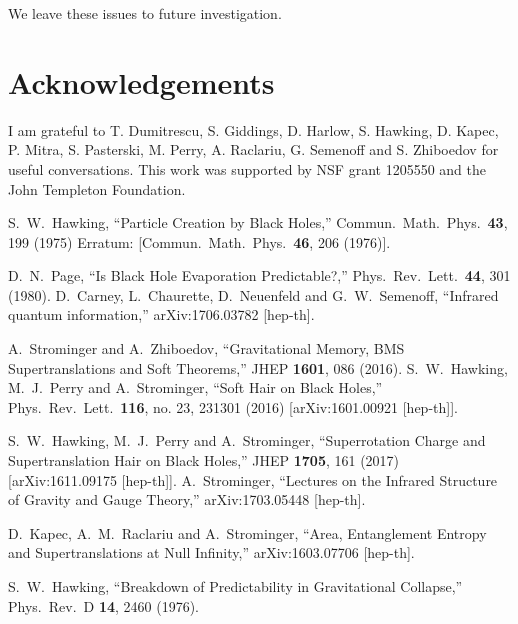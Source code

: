 \documentclass[12pt]{article}
\numberwithin{equation}{section}
\begin{document}
 
We leave these issues to future investigation. 


\section*{Acknowledgements}
I am   grateful  to T. Dumitrescu, S. Giddings, D. Harlow, S. Hawking, D. Kapec, P. Mitra, S. Pasterski, M. Perry, A. Raclariu, G. Semenoff and  S. Zhiboedov for useful conversations. This work was supported by NSF  grant  1205550 and the John Templeton Foundation.






\begin{thebibliography}{99}


  S.~W.~Hawking,
  ``Particle Creation by Black Holes,''
  Commun.\ Math.\ Phys.\  {\bf 43}, 199 (1975)
  Erratum: [Commun.\ Math.\ Phys.\  {\bf 46}, 206 (1976)].

 
  D.~N.~Page,
  ``Is Black Hole Evaporation Predictable?,''
  Phys.\ Rev.\ Lett.\  {\bf 44}, 301 (1980).
  D.~Carney, L.~Chaurette, D.~Neuenfeld and G.~W.~Semenoff,
  ``Infrared quantum information,''
  arXiv:1706.03782 [hep-th].

  A.~Strominger and A.~Zhiboedov,
  ``Gravitational Memory, BMS Supertranslations and Soft Theorems,''
  JHEP {\bf 1601}, 086 (2016).
  S.~W.~Hawking, M.~J.~Perry and A.~Strominger,
  ``Soft Hair on Black Holes,''
  Phys.\ Rev.\ Lett.\  {\bf 116}, no. 23, 231301 (2016)  [arXiv:1601.00921 [hep-th]].
  
  S.~W.~Hawking, M.~J.~Perry and A.~Strominger,
  ``Superrotation Charge and Supertranslation Hair on Black Holes,''
  JHEP {\bf 1705}, 161 (2017)
  [arXiv:1611.09175 [hep-th]].
  A.~Strominger,
  ``Lectures on the Infrared Structure of Gravity and Gauge Theory,''
  arXiv:1703.05448 [hep-th].
 
  D.~Kapec, A.~M.~Raclariu and A.~Strominger,
  ``Area, Entanglement Entropy and Supertranslations at Null Infinity,''
  arXiv:1603.07706 [hep-th].

  S.~W.~Hawking,
  ``Breakdown of Predictability in Gravitational Collapse,''
  Phys.\ Rev.\ D {\bf 14}, 2460 (1976).


\end{thebibliography}
\end{document}
